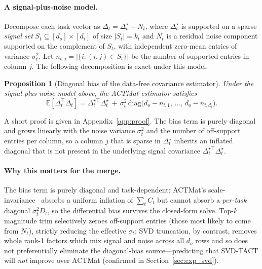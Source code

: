 \documentclass{article}
\theoremstyle{plain}
\newtheorem{proposition}[theorem]{Proposition}
\theoremstyle{definition}
\theoremstyle{remark}
\begin{document}
\paragraph{A signal-plus-noise model.} Decompose each task vector as $\Delta_t = \Delta_t^\star + N_t$, where $\Delta_t^\star$ is supported on a sparse \emph{signal set} $S_t \subseteq [d_o]\times[d_i]$ of size $|S_t| = k_t$ and $N_t$ is a residual noise component supported on the complement of $S_t$, with independent zero-mean entries of variance $\sigma_t^2$. Let $n_{t,j} = |\{i : (i,j) \in S_t\}|$ be the number of supported entries in column $j$. The following decomposition is exact under this model.

\begin{proposition}[Diagonal bias of the data-free covariance estimator]
\label{prop:bias}
Under the signal-plus-noise model above, the ACTMat estimator satisfies
\begin{equation}
\mathbb{E}[\Delta_t^\top \Delta_t] = \Delta_t^{\star\top}\Delta_t^\star \,+\, \sigma_t^2\,\mathrm{diag}\!\big(d_o - n_{t,1},\,\ldots,\,d_o - n_{t,d_i}\big).
\label{eq:bias}
\end{equation}
\end{proposition}
A short proof is given in Appendix~\ref{app:proof}. The bias term is purely diagonal and grows linearly with the noise variance $\sigma_t^2$ and the number of off-support entries per column, so a column $j$ that is sparse in $\Delta_t^\star$ inherits an inflated diagonal that is not present in the underlying signal covariance $\Delta_t^{\star\top}\Delta_t^\star$.

\paragraph{Why this matters for the merge.} The bias term is purely diagonal and task-dependent: ACTMat's scale-invariance~\citep{hameed2026actmat} absorbs a uniform inflation of $\sum_t C_t$ but cannot absorb a \emph{per-task} diagonal $\sigma_t^2 D_t$, so the differential bias survives the closed-form solve. Top-$k$ magnitude trim selectively zeroes off-support entries (those most likely to come from $N_t$), strictly reducing the effective $\sigma_t$; SVD truncation, by contrast, removes whole rank-1 factors which mix signal and noise across all $d_o$ rows and so does not preferentially eliminate the diagonal-bias source---predicting that SVD-TACT will \emph{not} improve over ACTMat (confirmed in Section~\ref{sec:exp_svd}).
\end{document}

